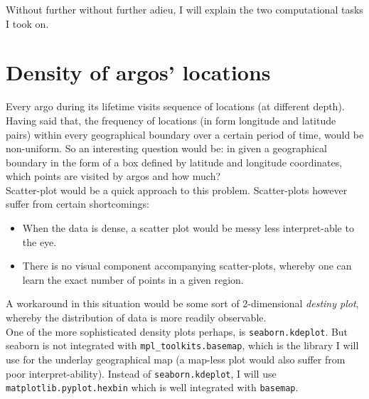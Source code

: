\documentclass[12pt]{article}
\begin{document}
Without further without further adieu, I will explain the two computational tasks I
took on.

\section{Density of argos' locations}

Every argo during its lifetime visits sequence of 
locations (at different depth). Having said that, the frequency of
locations (in form longitude and latitude pairs) within every geographical boundary over a certain period of time,
would be non-uniform. So an interesting question would be: in given a geographical boundary in the form of a box defined
by latitude and longitude coordinates, which points are visited by argos and how much?\\

Scatter-plot would be a quick approach to this problem. Scatter-plots however suffer from certain shortcomings:

\begin{itemize}
    \item When the data is dense, a scatter plot would be messy less interpret-able to the eye. 
    \item There is no visual component accompanying scatter-plots, whereby one can learn the exact number of points in a given region.
\end{itemize}

A workaround in this situation would be some sort of 2-dimensional \textit{destiny plot}, whereby
the distribution of data is more readily observable. \\

One of the more sophisticated density plots perhaps, is 
\verb|seaborn.kdeplot|. 
But seaborn is not integrated with \verb|mpl_toolkits.basemap|,
which is the library I will use for the underlay geographical 
map (a map-less plot would also suffer from poor interpret-ability). 
Instead of \verb|seaborn.kdeplot|, I will use 
\verb|matplotlib.pyplot.hexbin| which
is well integrated with \verb|basemap|.\\
\end{document}
